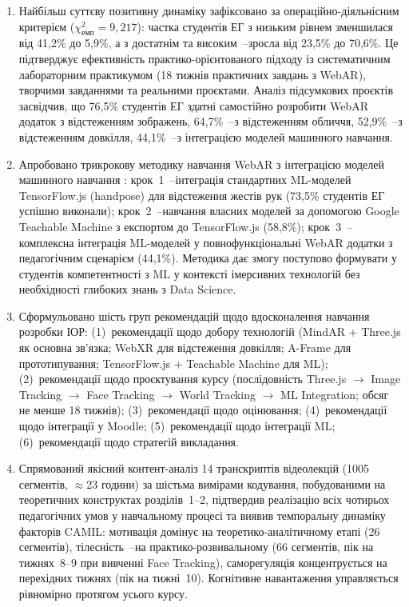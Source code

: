 \begin{enumerate}[label=\arabic*.]
\item Найбільш суттєву позитивну динаміку зафіксовано за операційно-діяльнісним критерієм ($\chi^2_{\text{емп}} = 9{,}217$): частка студентів ЕГ з низьким рівнем зменшилася від 41,2\% до 5,9\%, а з достатнім та високим~--зросла від 23,5\% до 70,6\%. Це підтверджує ефективність практико-орієнтованого підходу із систематичним лабораторним практикумом (18 тижнів практичних завдань з WebAR), творчими завданнями та реальними проєктами. Аналіз підсумкових проєктів засвідчив, що 76,5\% студентів ЕГ здатні самостійно розробити WebAR додаток з відстеженням зображень, 64,7\%~--з відстеженням обличчя, 52,9\%~--з відстеженням довкілля, 44,1\%~--з інтеграцією моделей машинного навчання.

\item Апробовано трикрокову методику навчання WebAR з інтеграцією моделей машинного навчання \cite{Semerikov2024WebARML_CoSinE, Semerikov2024WebAR_EduDim}: крок~1~--інтеграція стандартних ML-моделей TensorFlow.js (handpose) для відстеження жестів рук (73,5\% студентів ЕГ успішно виконали); крок~2~--навчання власних моделей за допомогою Google Teachable Machine з експортом до TensorFlow.js (58,8\%); крок~3~--комплексна інтеграція ML-моделей у повнофункціональні WebAR додатки з педагогічним сценарієм (44,1\%). Методика дає змогу поступово формувати у студентів компетентності з ML у контексті імерсивних технологій без необхідності глибоких знань з Data Science.

\item Сформульовано шість груп рекомендацій щодо вдосконалення навчання розробки ІОР: (1)~рекомендації щодо добору технологій (MindAR + Three.js як основна зв'язка; WebXR для відстеження довкілля; A-Frame для прототипування; TensorFlow.js + Teachable Machine для ML); (2)~рекомендації щодо проєктування курсу (послідовність Three.js $\to$ Image Tracking $\to$ Face Tracking $\to$ World Tracking $\to$ ML Integration; обсяг не менше 18 тижнів); (3)~рекомендації щодо оцінювання; (4)~рекомендації щодо інтеграції у Moodle; (5)~рекомендації щодо інтеграції ML; (6)~рекомендації щодо стратегій викладання.

\item Спрямований якісний контент-аналіз 14 транскриптів відеолекцій (1005 сегментів, $\approx$23 години) за шістьма вимірами кодування, побудованими на теоретичних конструктах розділів~1--2, підтвердив реалізацію всіх чотирьох педагогічних умов у навчальному процесі та виявив темпоральну динаміку факторів CAMIL: мотивація домінує на теоретико-аналітичному етапі (26 сегментів), тілесність~--на практико-розвивальному (66 сегментів, пік на тижнях~8--9 при вивченні Face Tracking), саморегуляція концентрується на перехідних тижнях (пік на тижні~10). Когнітивне навантаження управляється рівномірно протягом усього курсу.


\end{enumerate}
